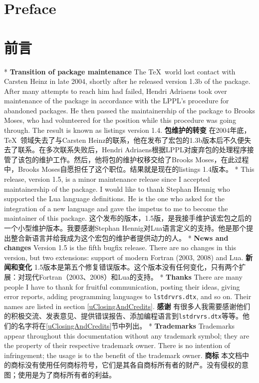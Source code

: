 \begin{paracol}{2}
\section*{Preface}
\switchcolumn
\section*{前言}
\switchcolumn[0]*%
\textbf{Transition of package maintenance}
The \TeX\ world lost contact with Carsten Heinz in late 2004, shortly after
he released version 1.3b of the  package.  After many
attempts to reach him had failed, Hendri Adriaens took over maintenance of
the package in accordance with the LPPL's procedure for abandoned packages.
He then passed the maintainership of the package to Brooks Moses, who had
volunteered for the position while this procedure was going through. The
result is known as listings version 1.4.
\switchcolumn
\textbf{包维护的转变}
在2004年底，\TeX\ 领域失去了与Carsten Heinz的联系，他在发布了宏包的1.3b版本后不久便失去了联系。在多次联系失败后，Hendri Adriaens根据LPPL对废弃包的处理程序接管了该包的维护工作。然后，他将包的维护权移交给了Brooks Moses，在此过程中，Brooks Moses自愿担任了这个职位。结果就是现在的listings 1.4版本。
\switchcolumn[0]*%
This release, version 1.5, is a minor maintenance release since
I accepted maintainership of the package.  I would like to thank Stephan
Hennig who supported the Lua language definitions. He is the one who
asked for the integration of a new language and gave the impetus to me to
become the maintainer of this package.
\switchcolumn
这个发布的版本，1.5版，是我接手维护该宏包之后的一个小型维护版本。我要感谢Stephan Hennig对Lua语言定义的支持。他是那个提出整合新语言并给我成为这个宏包的维护者提供动力的人。
\switchcolumn[0]*%
\textbf{News and changes}
Version 1.5 is the fifth bugfix release.  There are no changes
in this version, but two extensions: support of modern Fortran (2003,
2008) and Lua.
\switchcolumn
\textbf{新闻和变化}
1.5版本是第五个修复错误版本。这个版本没有任何变化，只有两个扩展：对现代Fortran（2003、2008）和Lua的支持。
\switchcolumn[0]*%
\vfill
\textbf{Thanks}
There are many people I have to thank for fruitful communication, posting
their ideas, giving error reports, adding programming languages to
\texttt{lstdrvrs.dtx}, and so on. Their names are listed in section
\ref{uClosingAndCredits}.
\switchcolumn
\textbf{感谢}
有很多人我需要感谢他们的积极交流、发表意见、提供错误报告、添加编程语言到\texttt{lstdrvrs.dtx}等等。他们的名字将在\ref{uClosingAndCredits}节中列出。
\switchcolumn[0]*%
\textbf{Trademarks}
Trademarks appear throughout this documentation without any trademark
symbol; they are the property of their respective trademark owner.
There is no intention of infringement; the usage is to the benefit of the
trademark owner.
\switchcolumn
\textbf{商标}
本文档中的商标没有使用任何商标符号，它们是其各自商标所有者的财产。没有侵权的意图；使用是为了商标所有者的利益。
\end{paracol}